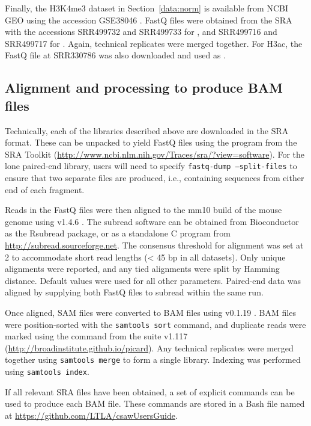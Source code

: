 \documentclass{report}\usepackage[]{graphicx}\usepackage[usenames,dvipsnames]{color}
\begin{document}
Finally, the H3K4me3 dataset in Section~\ref{data:norm} is available from NCBI GEO using the accession GSE38046 \cite{domingo2012}.
FastQ files were obtained from the SRA with the accessions SRR499732 and SRR499733 for , and SRR499716 and SRR499717 for . 
Again, technical replicates were merged together.
For H3ac, the FastQ file at SRR330786 was also downloaded and used as .
 
\subsection{Alignment and processing to produce BAM files}
Technically, each of the libraries described above are downloaded in the SRA format. 
These can be unpacked to yield FastQ files using the  program from the SRA Toolkit (\url{http://www.ncbi.nlm.nih.gov/Traces/sra/?view=software}). 
For the lone paired-end library, users will need to specify \texttt{fastq-dump --split-files} to ensure that two separate files are produced, i.e., containing sequences from either end of each fragment.

Reads in the FastQ files were then aligned to the mm10 build of the mouse genome using  v1.4.6 \cite{liao2013}. 
The subread software can be obtained from Bioconductor as the Rsubread package, or as a standalone C program from \url{http://subread.sourceforge.net}. 
The consensus threshold for alignment was set at 2 to accommodate short read lengths (\textless{} 45 bp in all datasets).
Only unique alignments were reported, and any tied alignments were split by Hamming distance.
Default values were used for all other parameters.
Paired-end data was aligned by supplying both FastQ files to subread within the same run.

Once aligned, SAM files were converted to BAM files using  v0.1.19 \cite{li2009}. 
BAM files were position-sorted with the \texttt{samtools sort} command, and duplicate reads were marked using the  command from the  suite v1.117 (\url{http://broadinstitute.github.io/picard}).
Any technical replicates were merged together using \texttt{samtools merge} to form a single library. 
Indexing was performed using \texttt{samtools index}.

If all relevant SRA files have been obtained, a set of explicit commands can be used to produce each BAM file.
These commands are stored in a Bash file named  at \url{https://github.com/LTLA/csawUsersGuide}.
\end{document}
